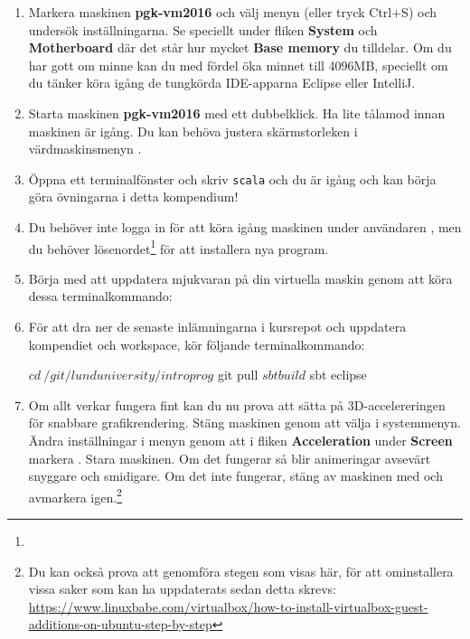 \begin{enumerate}
\item Markera maskinen \textbf{pgk-vm2016} och välj menyn  (eller tryck Ctrl+S) och undersök inställningarna. Se speciellt under fliken \textbf{System} och \textbf{Motherboard} där det står hur mycket \textbf{Base memory} du tilldelar. Om du har gott om minne kan du med fördel öka minnet till 4096MB, speciellt om du tänker köra igång de tungkörda IDE-apparna Eclipse eller IntelliJ.

\item Starta maskinen \textbf{pgk-vm2016} med ett dubbelklick. Ha lite tålamod innan maskinen är igång. Du kan behöva justera skärmstorleken i värdmaskinsmenyn .

\item Öppna ett terminalfönster och skriv \texttt{scala} och du är igång och kan börja göra övningarna i detta kompendium!

\item Du behöver inte logga in för att köra igång maskinen under användaren , men du  behöver lösenordet\footnote{} för att installera nya program.

\item Börja med att uppdatera mjukvaran på din virtuella maskin genom att köra dessa terminalkommando:


\item För att dra ner de senaste inlämningarna i kursrepot och uppdatera kompendiet och workspace, kör följande terminalkommando:
\begin{REPLnonum}
$ cd ~/git/lunduniversity/introprog
$ git pull
$ sbt build
$ sbt eclipse
\end{REPLnonum}

\item Om allt verkar fungera fint kan du nu prova att sätta på 3D-accelereringen för snabbare grafikrendering. Stäng maskinen genom att välja  i systemmenyn. Ändra inställningar i menyn  genom att i fliken \textbf{Acceleration} under \textbf{Screen} markera . Stara maskinen. Om det fungerar så blir animeringar avsevärt snyggare och smidigare. Om det inte fungerar, stäng av maskinen med  och avmarkera  igen.\footnote{Du kan också prova att genomföra stegen som visas här, för att ominstallera vissa saker som kan ha uppdaterats sedan detta skrevs: \url{https://www.linuxbabe.com/virtualbox/how-to-install-virtualbox-guest-additions-on-ubuntu-step-by-step}}

\end{enumerate}